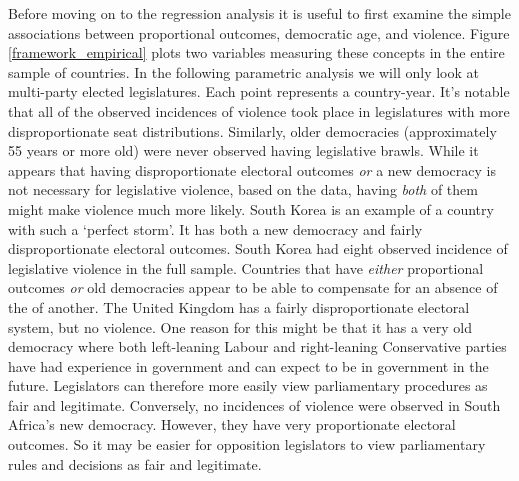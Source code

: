 \documentclass[a4paper]{article}\usepackage{graphicx, color}
\begin{document}
Before moving on to the regression analysis it is useful to first examine the simple associations between proportional outcomes, democratic age, and violence. Figure \ref{framework_empirical} plots two variables measuring these concepts in the entire sample of countries. In the following parametric analysis we will only look at multi-party elected legislatures. Each point represents a country-year. It's notable that all of the observed incidences of violence took place in legislatures with more disproportionate seat distributions. Similarly, older democracies (approximately 55 years or more old) were never observed having legislative brawls. While it appears that having disproportionate electoral outcomes \emph{or} a new democracy is not necessary for legislative violence, based on the data, having \emph{both} of them might make violence much more likely. South Korea is an example of a country with such a `perfect storm'. It has both a new democracy and fairly disproportionate electoral outcomes. South Korea had eight observed incidence of legislative violence in the full sample. Countries that have \emph{either} proportional outcomes \emph{or} old democracies appear to be able to compensate for an absence of the of another. The United Kingdom has a fairly disproportionate electoral system, but no violence. One reason for this might be that it has a very old democracy where both left-leaning Labour and right-leaning Conservative parties have had experience in government and can expect to be in government in the future. Legislators can therefore more easily view parliamentary procedures as fair and legitimate. Conversely, no incidences of violence were observed in South Africa's new democracy. However, they have very proportionate electoral outcomes. So it may be easier for opposition legislators to view parliamentary rules and decisions as fair and legitimate.
\end{document}
